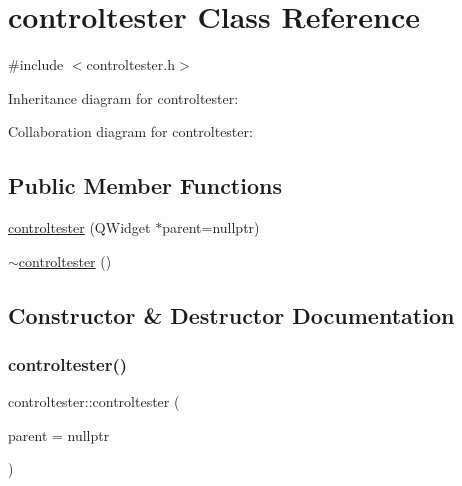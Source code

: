 \hypertarget{classcontroltester}{}\section{controltester Class Reference}
\label{classcontroltester}


{\ttfamily \#include $<$controltester.\+h$>$}



Inheritance diagram for controltester\+:


Collaboration diagram for controltester\+:
\subsection*{Public Member Functions}
\begin{DoxyCompactItemize}
\item 
\mbox{\hyperlink{classcontroltester_ac536f09bcb3f881b27c33436415420a2}{controltester}} (Q\+Widget $\ast$parent=nullptr)
\item 
\mbox{\hyperlink{classcontroltester_a1310e9effde122990b504f0b483ccc75}{$\sim$controltester}} ()
\end{DoxyCompactItemize}


\subsection{Constructor \& Destructor Documentation}
\mbox{\label{classcontroltester_ac536f09bcb3f881b27c33436415420a2}} 
\subsubsection{\texorpdfstring{controltester()}{controltester()}}
{\footnotesize\ttfamily controltester\+::controltester (\begin{DoxyParamCaption}\item[{Q\+Widget $\ast$}]{parent = {\ttfamily nullptr} }\end{DoxyParamCaption})\hspace{0.3cm}{\ttfamily [explicit]}}

\mbox{\label{classcontroltester_a1310e9effde122990b504f0b483ccc75}} 
